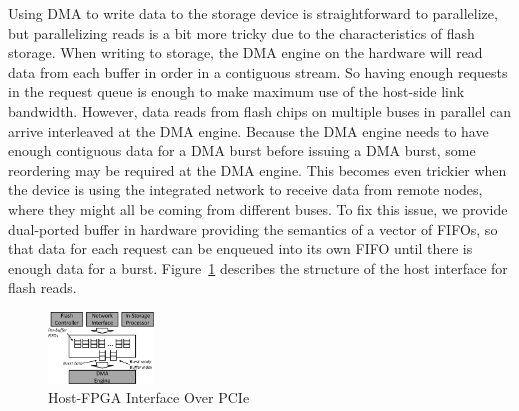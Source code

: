 Using DMA to write data to the storage device is straightforward to parallelize,
but parallelizing reads is a bit more tricky due to the characteristics of flash
storage. When writing to storage, the DMA engine on the hardware will read data
from each buffer in order in a contiguous stream. So having enough requests in
the request queue is enough to make maximum use of the host-side link bandwidth.
However, data reads from flash chips on multiple buses in parallel can arrive
interleaved at the DMA engine. Because the DMA engine needs to have enough
contiguous data for a DMA burst before issuing a DMA burst, some reordering may
be required at the DMA engine. This becomes even trickier when the device is
using the integrated network to receive data from remote nodes, where they might
all be coming from different buses. To fix this issue, we provide dual-ported
buffer in hardware providing the semantics of a vector of FIFOs, so that data
for each request can be enqueued into its own FIFO until there is enough data
for a burst.
Figure~\ref{fig:hostinterface} describes the structure of the host interface for
flash reads.

\begin{figure}[t!]
	\centering
	\includegraphics[width=0.25\textwidth]{figures/dmawrite-crop.pdf}
	\caption{Host-FPGA Interface Over PCIe}
	\label{fig:hostinterface}
\end{figure}

